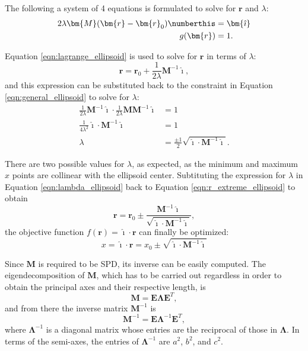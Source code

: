 The following a system of 4 equations is formulated to solve for $\bm{r}$ and $\lambda$:
\begin{align*}
    2\lambda \bm{M}(\bm{r} - \bm{r}_0) \numberthis \label{eqn:lagrange_ellipsoid} &= \bm{\hat{\imath}} \\
    g(\bm{r}) &= 1.
\end{align*}

Equation \ref{eqn:lagrange_ellipsoid} is used to solve for $\bm{r}$ in terms of $\lambda$:
\begin{equation}
    \bm{r} = \bm{r}_0 + \frac{1}{2\lambda} \bm{M}^{-1} \bm{\hat{\imath}}, \label{eqn:r_extreme_ellipsoid}
\end{equation}
and this expression can be substituted back to the constraint in Equation \ref{eqn:general_ellipsoid} to solve for $\lambda$:
\begin{align}
    \frac{1}{2\lambda} \bm{M}^{-1} \bm{\hat{\imath}} \cdot \frac{1}{2\lambda} \bm{M} \bm{M}^{-1} \bm{\hat{\imath}} &= 1 \\
    \frac{1}{4\lambda^2} \bm{\hat{\imath}} \cdot \bm{M}^{-1} \bm{\hat{\imath}} &= 1 \\
    \lambda &= \frac{\pm 1}{2} \sqrt{\bm{\hat{\imath}} \cdot \bm{M}^{-1} \bm{\hat{\imath}}} \label{eqn:lambda_ellipsoid}.
\end{align}

There are two possible values for $\lambda$, as expected, as the minimum and maximum $x$ points are collinear with the ellipsoid center. Subtituting the expression for $\lambda$ in Equation \ref{eqn:lambda_ellipsoid}
back to Equation \ref{eqn:r_extreme_ellipsoid} to obtain
\begin{equation}
    \bm{r} = \bm{r}_0 \pm \frac{\bm{M}^{-1} \bm{\hat{\imath}}}{\sqrt{\bm{\hat{\imath}} \cdot \bm{M}^{-1} \bm{\hat{\imath}}}},
\end{equation}
the objective function $f(\bm{r}) = \bm{\hat{\imath}} \cdot \bm{r}$ can finally be optimized:
\begin{equation}
    x = \bm{\hat{\imath}} \cdot \bm{r} = x_0 \pm \sqrt{\bm{\hat{\imath}} \cdot \bm{M}^{-1} \bm{\hat{\imath}}} \label{eqn:extrema_ellipsoid}
\end{equation}

Since $\bm{M}$ is required to be SPD, its inverse can be easily computed. The eigendecomposition of $\bm{M}$, which has to be carried out regardless in order to obtain the principal axes and their respective length, is
\begin{equation}
    \bm{M} = \bm{E} \bm{\Lambda} \bm{E}^{T},
\end{equation}
and from there the inverse matrix $\bm{M}^{-1}$ is
\begin{equation}
    \bm{M}^{-1} = \bm{E} \bm{\Lambda}^{-1} \bm{E}^{T},
    \label{eqn:ellipsoid_Minv}
\end{equation}
where $\bm{\Lambda}^{-1}$ is a diagonal matrix whose entries are the reciprocal of those in $\bm{\Lambda}$. In terms of the semi-axes, the entries of $\bm{\Lambda}^{-1}$ are $a^2$, $b^2$, and $c^2$.

